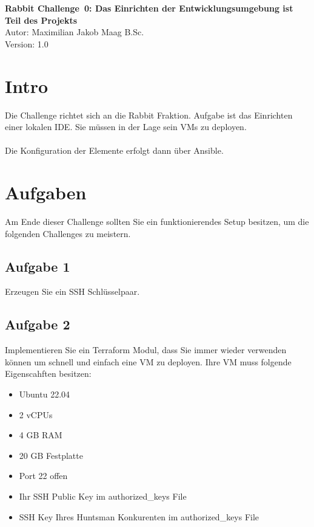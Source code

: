 \documentclass{article}
\begin{document}
    \begin{center}
        \Large \textbf{Rabbit Challenge 0: Das Einrichten der Entwicklungsumgebung ist Teil des Projekts } \\ [6pt]
        \normalsize
        Autor: Maximilian Jakob Maag B.Sc. \\
        Version: 1.0
    \end{center}

    \section{Intro}
    Die Challenge richtet sich an die Rabbit Fraktion. Aufgabe ist das Einrichten einer lokalen IDE.
    Sie müssen in der Lage sein VMs zu deployen.
    \\ \\
    Die Konfiguration der Elemente erfolgt dann über Ansible.

    \section{Aufgaben}
    Am Ende dieser Challenge sollten Sie ein funktionierendes Setup besitzen, um die folgenden Challenges zu meistern.

    \subsection{Aufgabe 1}
    Erzeugen Sie ein SSH Schlüsselpaar.

    \subsection{Aufgabe 2}
    Implementieren Sie ein Terraform Modul, dass Sie immer wieder verwenden können um schnell und einfach eine VM zu deployen.
    Ihre VM muss folgende Eigenscahften besitzen:
    \begin{itemize}
        \item Ubuntu 22.04
        \item 2 vCPUs
        \item 4 GB RAM
        \item 20 GB Festplatte
        \item Port 22 offen
        \item Ihr SSH Public Key im authorized_keys File
        \item SSH Key Ihres Huntsman Konkurenten im authorized_keys File
    \end{itemize}
\end{document}
